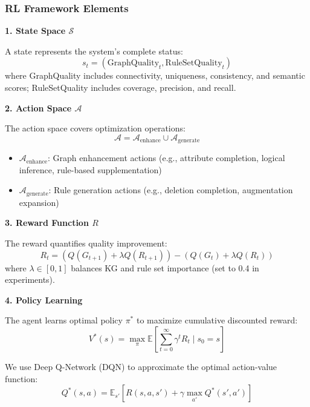 \documentclass[runningheads]{llncs}
\begin{document}
\subsubsection{RL Framework Elements}

\textbf{1. State Space $\mathcal{S}$}

A state represents the system's complete status:
\begin{equation}
s_t = (\text{GraphQuality}_t, \text{RuleSetQuality}_t)
\end{equation}
where GraphQuality includes connectivity, uniqueness, consistency, and semantic scores; RuleSetQuality includes coverage, precision, and recall.

\textbf{2. Action Space $\mathcal{A}$}

The action space covers optimization operations:
\begin{equation}
\mathcal{A} = \mathcal{A}_{\text{enhance}} \cup \mathcal{A}_{\text{generate}}
\end{equation}
\begin{itemize}
    \item $\mathcal{A}_{\text{enhance}}$: Graph enhancement actions (e.g., attribute completion, logical inference, rule-based supplementation)
    \item $\mathcal{A}_{\text{generate}}$: Rule generation actions (e.g., deletion completion, augmentation expansion)
\end{itemize}

\textbf{3. Reward Function $R$}

The reward quantifies quality improvement:
\begin{equation}
\label{eq:reward_def}
R_t = (Q(G_{t+1}) + \lambda Q(R_{t+1})) - (Q(G_t) + \lambda Q(R_t))
\end{equation}
where $\lambda \in [0,1]$ balances KG and rule set importance (set to 0.4 in experiments).

\textbf{4. Policy Learning}

The agent learns optimal policy $\pi^*$ to maximize cumulative discounted reward:
\begin{equation}
V^*(s) = \max_{\pi} \mathbb{E} \left[ \sum_{t=0}^{\infty} \gamma^t R_{t} \mid s_0 = s \right]
\end{equation}

We use Deep Q-Network (DQN) to approximate the optimal action-value function:
\begin{equation}
Q^*(s, a) = \mathbb{E}_{s'} \left[ R(s, a, s') + \gamma \max_{a'} Q^*(s', a') \right]
\end{equation}
\end{document}
